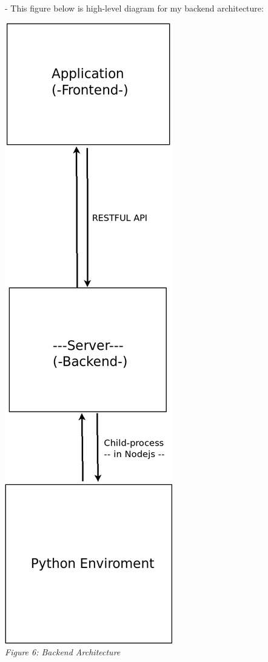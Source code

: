 \newpage
- This figure below is high-level diagram for my backend architecture:\\
\begin{center}
\includegraphics[scale=0.30]{backend} \\
\textit{Figure 6: Backend Architecture}
\end{center}

